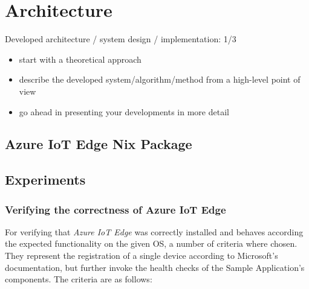 \chapter{Architecture}
\begin{tcolorbox}[title=TODO]
Developed architecture / system design / implementation: 1/3

\begin{itemize}
\item start with a theoretical approach
\item describe the developed system/algorithm/method from a high-level point of view
\item go ahead in presenting your developments in more detail
\end{itemize}
\end{tcolorbox}


\section{Azure IoT Edge Nix Package}

\section{Experiments}
\subsection{Verifying the correctness of Azure IoT Edge}
For verifying that \textit{Azure IoT Edge} was correctly installed
and behaves according the expected functionality on the given
\ac{OS}, a number of criteria where chosen. They represent the registration
of a single device according to Microsoft's documentation, but further
invoke the health checks of the Sample Application's components.
The criteria are as follows:

